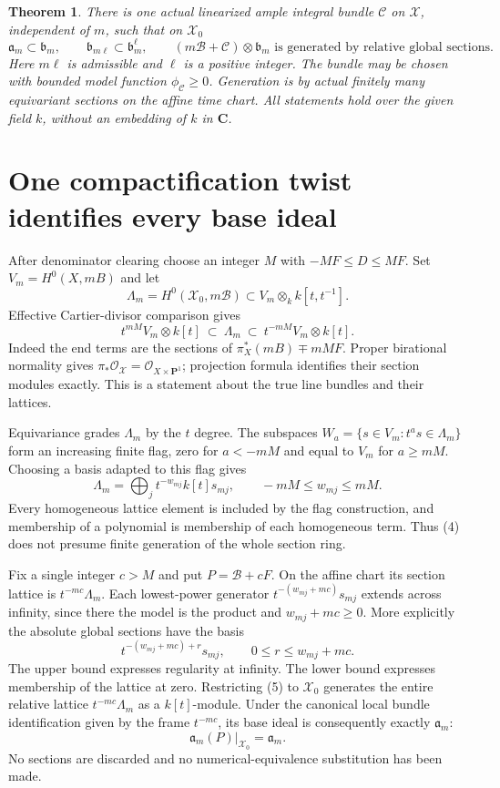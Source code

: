 \documentclass[10pt]{article}
\newtheorem{theorem}{Theorem}
\newcommand{\OO}{\mathcal O}
\begin{document}
\begin{theorem}\label{uniform}
There is one actual linearized ample integral bundle $\mathcal C$ on
$\mathcal X$, independent of $m$, such that on $\mathcal X_0$
\[
 \mathfrak a_m\subset\mathfrak b_m,\qquad
 \mathfrak b_{m\ell}\subset\mathfrak b_m^\ell,\qquad
 (m\mathcal B+\mathcal C)\otimes\mathfrak b_m
       \text{ is generated by relative global sections}.          \tag{2}
\]
Here $m\ell$ is admissible and $\ell$ is a positive integer.
The bundle may be chosen with bounded model function $\phi_{\mathcal C}
\geq0$. Generation is by actual finitely many equivariant sections on
the affine time chart. All statements hold over the given field $k$,
without an embedding of $k$ in $\mathbf C$.
\end{theorem}

\section{One compactification twist identifies every base ideal}
After denominator clearing choose an integer $M$ with
$-MF\leq D\leq MF$. Set $V_m=H^0(X,mB)$ and let
\[
 \Lambda_m=H^0(\mathcal X_0,m\mathcal B)
       \subset V_m\otimes_k k[t,t^{-1}].
\]
Effective Cartier-divisor comparison gives
\[
 t^{mM}V_m\otimes k[t]\ \subset\ \Lambda_m
       \ \subset\ t^{-mM}V_m\otimes k[t].                \tag{3}
\]
Indeed the end terms are the sections of
$\pi_X^*(mB)\mp mMF$. Proper birational normality gives
$\pi_*\OO_{\mathcal X}=\OO_{X\times\mathbf P^1}$;
projection formula identifies their section modules exactly.
This is a statement about the true line bundles and their lattices.

Equivariance grades $\Lambda_m$ by the $t$ degree. The subspaces
$W_a=\{s\in V_m:t^as\in\Lambda_m\}$ form an increasing finite flag,
zero for $a<-mM$ and equal to $V_m$ for $a\geq mM$.
Choosing a basis adapted to this flag gives
\[
 \Lambda_m=\bigoplus_j t^{-w_{mj}}k[t]s_{mj},
                 \qquad -mM\leq w_{mj}\leq mM.           \tag{4}
\]
Every homogeneous lattice element is included by the flag construction,
and membership of a polynomial is membership of each homogeneous term.
Thus (4) does not presume finite generation of the whole section ring.

Fix a single integer $c>M$ and put
$P=\mathcal B+cF$. On the affine chart its section lattice is
$t^{-mc}\Lambda_m$. Each lowest-power generator
$t^{-(w_{mj}+mc)}s_{mj}$ extends across infinity, since there the
model is the product and $w_{mj}+mc\geq0$. More explicitly the absolute
global sections have the basis
\[
 t^{-(w_{mj}+mc)+r}s_{mj},
                 \qquad 0\leq r\leq w_{mj}+mc.           \tag{5}
\]
The upper bound expresses regularity at infinity. The lower bound
expresses membership of the lattice at zero. Restricting (5) to
$\mathcal X_0$ generates the entire relative lattice
$t^{-mc}\Lambda_m$ as a $k[t]$-module. Under the canonical local
bundle identification given by the frame $t^{-mc}$, its base ideal
is consequently exactly $\mathfrak a_m$:
\[
 \mathfrak a_m(P)|_{\mathcal X_0}=\mathfrak a_m.          \tag{6}
\]
No sections are discarded and no numerical-equivalence substitution
has been made.
\end{document}
